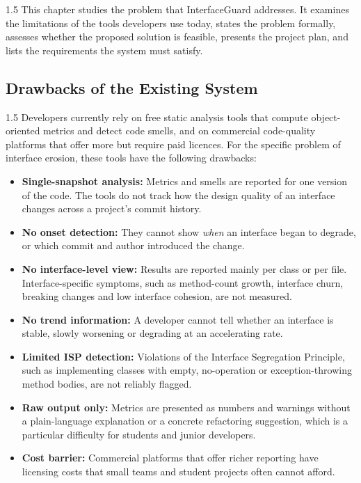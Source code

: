 \documentclass[12pt,a4paper]{article}
\begin{document}
\begin{spacing}{1.5}
\justifying
This chapter studies the problem that InterfaceGuard addresses. It examines
the limitations of the tools developers use today, states the problem
formally, assesses whether the proposed solution is feasible, presents the
project plan, and lists the requirements the system must satisfy.
\end{spacing}

\subsection{Drawbacks of the Existing System}

\begin{spacing}{1.5}
\justifying
Developers currently rely on free static analysis tools that compute
object-oriented metrics and detect code smells, and on commercial
code-quality platforms that offer more but require paid licences. For
the specific problem of interface erosion, these tools have the following
drawbacks:

\begin{itemize}[leftmargin=*,itemsep=3pt]
  \item \textbf{Single-snapshot analysis:} Metrics and smells are reported
        for one version of the code. The tools do not track how the design
        quality of an interface changes across a project's commit history.

  \item \textbf{No onset detection:} They cannot show \emph{when} an
        interface began to degrade, or which commit and author introduced
        the change.

  \item \textbf{No interface-level view:} Results are reported mainly per
        class or per file. Interface-specific symptoms, such as method-count
        growth, interface churn, breaking changes and low interface cohesion,
        are not measured.

  \item \textbf{No trend information:} A developer cannot tell whether
        an interface is stable, slowly worsening or degrading at an
        accelerating rate.

  \item \textbf{Limited ISP detection:} Violations of the Interface
        Segregation Principle, such as implementing classes with empty,
        no-operation or exception-throwing method bodies, are not reliably
        flagged.

  \item \textbf{Raw output only:} Metrics are presented as numbers and
        warnings without a plain-language explanation or a concrete
        refactoring suggestion, which is a particular difficulty for
        students and junior developers.

  \item \textbf{Cost barrier:} Commercial platforms that offer richer
        reporting have licensing costs that small teams and student
        projects often cannot afford.
\end{itemize}
\end{spacing}
\end{document}
